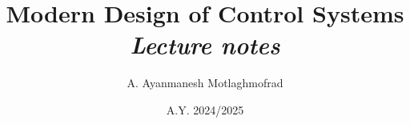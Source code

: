 \documentclass[a4paper, 12pt]{report}
\title{
    \textbf{\Huge{Modern Design of Control Systems}}\\
    \textit{Lecture notes}
}
\author{A. Ayanmanesh Motlaghmofrad}
\date{A.Y. 2024/2025}
\begin{document}
\maketitle
\tableofcontents











\appendix
\renewcommand{\theequation}{\thesection.\arabic{equation}}
\end{document}
